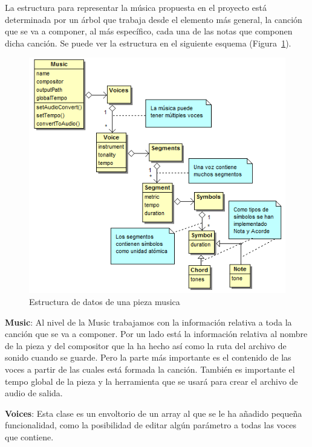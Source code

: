 
La estructura para representar la música propuesta en el proyecto está determinada por un árbol que trabaja desde el elemento más general, la canción que se va a componer, al más específico, cada una de las notas que componen dicha canción. Se puede ver la estructura en el siguiente esquema (Figura~\ref{fig:structmusic}).\\
	
	\begin{figure}[htbp]
	\centering
	\hspace*{-0.1in}
	\includegraphics[scale=0.6]{graphics/musica-estructura.png}
	\caption{Estructura de datos de una pieza musica}
	\label{fig:structmusic}
	\end{figure}


\textbf{Music}: Al nivel de la Music trabajamos con la información relativa a toda la canción que se va a componer. Por un lado está la información relativa al nombre de la pieza y del compositor que la ha hecho así como la ruta del archivo de sonido cuando se guarde. Pero la parte más importante es el contenido de las voces a partir de las cuales está formada la canción. También es importante el tempo global de la pieza y la herramienta que se usará para crear el archivo de audio de salida.
\newline

\textbf{Voices}: Esta clase es un envoltorio de un array al que se le ha añadido pequeña funcionalidad, como la posibilidad de editar algún parámetro a todas las voces que contiene.
\newline

